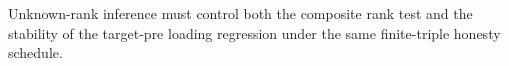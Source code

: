 Unknown-rank inference must control both the composite rank test and the stability of the target-pre loading regression under the same finite-triple honesty schedule.